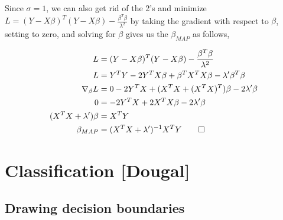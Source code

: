 \documentclass[letterpaper,10pt]{article} %
\newcommand{\prove}[1]{
\begin{Proof}
\begin{align*}
#1
\end{align*}
\end{Proof}
}
\begin{document}
Since $\sigma=1$, we can also get rid of the 2's and minimize $L=(Y-X\beta)^T(Y-X\beta)-\frac{\beta^T\beta}{\lambda^2}$ by taking the gradient with respect to $\beta$, setting to zero, and solving for $\beta$ gives us the $\beta_{MAP}$ as follows,

\prove{
L &= (Y-X\beta)^T(Y-X\beta)-\frac{\beta^T\beta}{\lambda^2}\\
L &= Y^TY -2Y^TX\beta+\beta^TX^TX\beta-\lambda^\prime\beta^T\beta \\
\nabla_{\beta}L &= 0 - 2Y^TX + (X^TX +(X^TX)^T)\beta -2\lambda^\prime\beta \\
0 &= -2Y^TX+2X^TX\beta-2\lambda^\prime\beta \\
(X^TX+\lambda^\prime)\beta &= X^TY \\
\beta_{MAP} &= (X^TX+\lambda^\prime)^{-1}X^TY\qedhere
}


\newpage
\section{Classification [Dougal]}
\subsection{Drawing decision boundaries}
\end{document}
